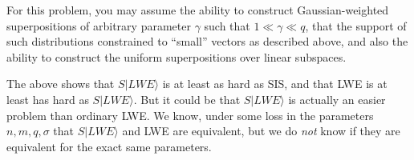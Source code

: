 \documentclass{article}
\begin{document}
For this problem, you may assume the ability to construct Gaussian-weighted superpositions of arbitrary parameter $\gamma$ such that $1\ll \gamma \ll q$, that the support of such distributions constrained to ``small'' vectors as described above, and also the ability to construct the  uniform superpositions over linear subspaces.

\begin{remark}The above shows that $S|LWE\rangle$ is at least as hard as SIS, and that LWE is at least has hard as $S|LWE\rangle$. But it could be that $S|LWE\rangle$ is actually an easier problem than ordinary LWE. We know, under some loss in the parameters $n,m,q,\sigma$ that $S|LWE\rangle$ and LWE are equivalent, but we do \emph{not} know if they are equivalent for the exact same parameters.
\end{remark}
\end{document}
